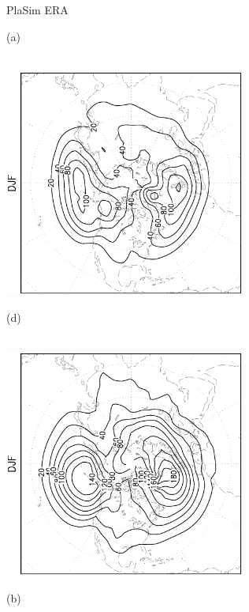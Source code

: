 \documentclass[12pt,a4paper,twoside,openright,headinclude,liststotoc,bibtotoc]{scrreprt}
\begin{document}
\begin{appendix}
\begin{figure}[c]
\hspace{3.5cm}PlaSim \vspace{0.2cm} \hspace{7.3cm} ERA \\
\parbox{8.5cm}{\hspace{0.90cm}\begin{scriptsize}(a)\end{scriptsize} \vspace{-0.5cm} \\
\includegraphics[height=7.5cm,angle=-90]
{eps/PLDJF1000z156fluxes_tr.eps}
}
\parbox{8.5cm}{\hspace{0.95cm}\begin{scriptsize}(d)\end{scriptsize} \vspace{-0.5cm} \\
\includegraphics[height=7.5cm,angle=-90]
{eps/ERA40_Z1000DJF_fluxes_tr.eps}
}
\parbox{8.5cm}{\hspace{0.90cm}\begin{scriptsize}(b)\end{scriptsize} \vspace{-0.2cm} \\
}
\end{figure}
\end{appendix}
\end{document}
